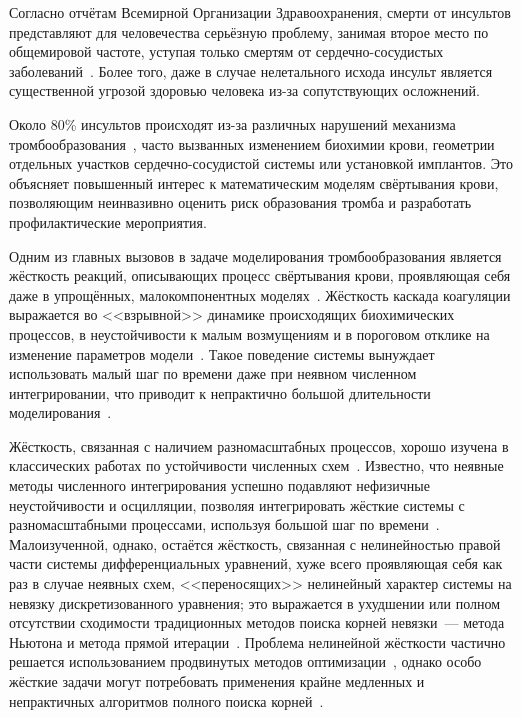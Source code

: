 \label{chapter:introduction} 

Согласно отчётам Всемирной Организации Здравоохранения,
смерти от инсультов представляют для человечества серьёзную проблему,
занимая второе место по общемировой частоте,
уступая только смертям от сердечно-сосудистых заболеваний~\cite{geoffrey2008stroke, who2020global_health_estimates}.
Более того, даже в случае нелетального исхода инсульт является существенной угрозой здоровью человека
из-за сопутствующих осложнений.

Около 80\% инсультов происходят из-за различных нарушений механизма тромбообразования~\cite{geoffrey2008stroke},
часто вызванных изменением биохимии крови,
геометрии отдельных участков сердечно-сосудистой системы
или установкой имплантов.
Это объясняет повышенный интерес к математическим моделям свёртывания крови,
позволяющим неинвазивно оценить риск образования тромба и разработать профилактические мероприятия.

Одним из главных вызовов в задаче моделирования тромбообразования является жёсткость реакций,
описывающих процесс свёртывания крови,
проявляющая себя даже в упрощённых, малокомпонентных моделях~\cite{bouchnita2020mathematical}.
Жёсткость каскада коагуляции выражается во <<взрывной>> динамике происходящих биохимических процессов,
в неустойчивости к малым возмущениям и в пороговом отклике на изменение параметров модели~\cite{shen2008threshold}.
Такое поведение системы вынуждает использовать малый шаг по времени даже при неявном численном интегрировании,
что приводит к непрактично большой длительности моделирования~\cite{douglas1967generalizedrk}.

Жёсткость, связанная с наличием разномасштабных процессов,
хорошо изучена в классических работах по устойчивости численных схем~\cite{auzinger1993modern, dahlquist1963special, dahlquist1975stability, liu2019study}.
Известно, что неявные методы численного интегрирования успешно подавляют нефизичные неустойчивости и осцилляции,
позволяя интегрировать жёсткие системы с разномасштабными процессами,
используя большой шаг по времени~\cite{heirer1999solvingode2}.
Малоизученной, однако, остаётся жёсткость, связанная с нелинейностью правой части системы дифференциальных уравнений,
хуже всего проявляющая себя как раз в случае неявных схем,
<<переносящих>> нелинейный характер системы на невязку дискретизованного уравнения;
это выражается в ухудшении или полном отсутствии сходимости традиционных методов поиска корней невязки~---
метода Ньютона и метода прямой итерации~\cite{lambert1991methods}.
Проблема нелинейной жёсткости частично решается использованием продвинутых
методов оптимизации~\cite{brown1985experiments, alexander1991modified, moore1994stepsize, schlenkrich2006application},
однако особо жёсткие задачи могут потребовать применения крайне медленных и непрактичных алгоритмов
полного поиска корней~\cite{farrell2016computation}.

